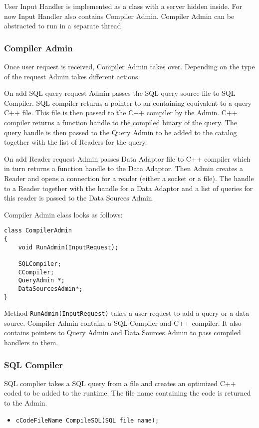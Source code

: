 \documentclass[11pt]{article}
\begin{document}
User Input Handler is implemented as a class with a server hidden inside. For now Input Handler also contains Compiler Admin. Compiler Admin can be abstracted to run in a separate thread. 

\subsubsection{Compiler Admin}

Once user request is received, Compiler Admin takes over. Depending on the type of the request Admin takes different actions. 

On add SQL query request Admin passes the SQL query source file to SQL Compiler. SQL compiler returns a pointer to an containing equivalent to a query C++ file. This file is then passed to the C++ compiler by the Admin. C++ compiler returns a function handle to the compiled binary of the query. The query handle is then passed to the Query Admin to be added to the catalog together with the list of Readers for the query.

On add Reader request Admin passes Data Adaptor file to C++ compiler which in turn returns a function handle to the Data Adaptor. Then Admin creates a Reader and opens a connection for a reader (either a socket or a file). The handle to a Reader together with the handle for a Data Adaptor and a list of queries for this reader is passed to the Data Sources Admin. 

\noindent Compiler Admin class looks as follows:
\begin{verbatim}
class CompilerAdmin
{
    void RunAdmin(InputRequest);
	
    SQLCompiler;
    CCompiler;
    QueryAdmin *;
    DataSourcesAdmin*;
}
\end{verbatim}

Method {\tt RunAdmin(InputRequest)} takes a user request to add a query or a data source. Compiler Admin contains a SQL Compiler and C++ compiler. It also contains pointers to Query Admin and Data Sources Admin to pass compiled handlers to them.

\subsubsection{SQL Compiler}

SQL complier takes a SQL query from a file and creates an optimized C++ coded to be added to the runtime. The file name containing the code is returned to the Admin.

\begin{itemize}
	\item {\tt cCodeFileName CompileSQL(SQL file name);}
\end{itemize}
\end{document}
